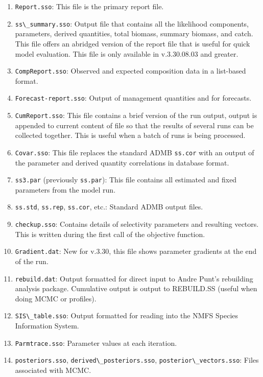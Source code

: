 \begin{enumerate}
		\item \verb|Report.sso|: This file is the primary report file.
		\item \verb|ss\_summary.sso|: Output file that contains all the likelihood components, parameters, derived quantities, total biomass, summary biomass, and catch. This file offers an abridged version of the report file that is useful for quick model evaluation. This file is only available in v.3.30.08.03 and greater.
		\item \verb|CompReport.sso|: Observed and expected composition data in a list-based format.
		\item \verb|Forecast-report.sso|: Output of management quantities and for forecasts.
		\item \verb|CumReport.sso|: This file contains a brief version of the run output, output is appended to current content of file so that the results of several runs can be collected together. This is useful when a batch of runs is being processed.
		\item \verb|Covar.sso|: This file replaces the standard ADMB \verb|ss.cor| with an output of the parameter and derived quantity correlations in database format.
		\item \verb|ss3.par| (previously \verb|ss.par|): This file contains all estimated and fixed parameters from the model run. 
		\item \verb|ss.std|, \verb|ss.rep|, \verb|ss.cor|, etc.: Standard ADMB output files.
		\item \verb|checkup.sso|: Contains details of selectivity parameters and resulting vectors. This is written during the first call of the objective function.
		\item \verb|Gradient.dat|: New for v.3.30, this file shows parameter gradients at the end of the run.
		\item \verb|rebuild.dat|: Output formatted for direct input to Andre Punt's rebuilding analysis package. Cumulative output is output to REBUILD.SS (useful when doing MCMC or profiles).
		\item \verb|SIS\_table.sso|: Output formatted for reading into the NMFS Species Information System.
		\item \verb|Parmtrace.sso|: Parameter values at each iteration.
		\item \verb|posteriors.sso|, \verb|derived\_posteriors.sso|, \verb|posterior\_vectors.sso|: Files associated with MCMC.
	\end{enumerate}

\pagebreak

